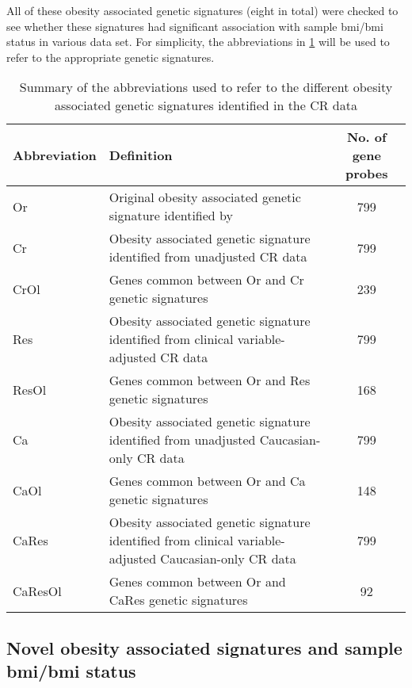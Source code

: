 All of these obesity associated genetic signatures (eight in total) were checked to see whether these signatures had significant association with sample \gls{bmi}/\gls{bmi} status in various data set.
For simplicity, the abbreviations in \cref{tab:mg_abbrev} will be used to refer to the appropriate genetic signatures.

\begin{table}[htpb]
	\centering
	\caption{Summary of the abbreviations used to refer to the different obesity associated genetic signatures identified in the CR data}
	\label{tab:mg_abbrev}
	\begin{tabular}{lp{}c}
		\hline
		\hline
		Abbreviation & Definition & No. of gene probes\\
		\hline
		\rule{0pt}{2.25ex}Or      & Original obesity associated genetic signature identified by \citet{Creighton2012}                       & 799\\
		\rule{0pt}{2.25ex}Cr      & Obesity associated genetic signature identified from unadjusted CR data                                & 799 \\
		\rule{0pt}{2.25ex}CrOl    & Genes common between Or and Cr genetic signatures                                                       & 239\\
		\rule{0pt}{2.25ex}Res     & Obesity associated genetic signature identified from clinical variable-adjusted CR data                & 799\\
		\rule{0pt}{2.25ex}ResOl   & Genes common between Or and Res genetic signatures                                                      & 168\\
		\rule{0pt}{2.25ex}Ca      & Obesity associated genetic signature identified from unadjusted Caucasian-only CR data                 & 799\\
		\rule{0pt}{2.25ex}CaOl    & Genes common between Or and Ca genetic signatures                                                       & 148\\
		\rule{0pt}{2.25ex}CaRes   & Obesity associated genetic signature identified from clinical variable-adjusted Caucasian-only CR data & 799\\
		\rule{0pt}{2.25ex}CaResOl & Genes common between Or and CaRes genetic signatures                                                    & 92\\
		\hline
		\hline
	\end{tabular}
\end{table}

\subsection{Novel obesity associated signatures and sample \gls{bmi}/\gls{bmi} status}
\label{sub:_novel_obesity_associated_signatures_and_sample_bmi}

